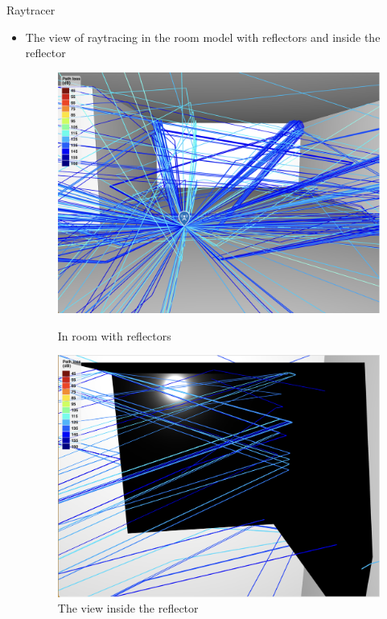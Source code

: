 \documentclass{beamer}
\begin{document}
\begin{frame}[t]{Raytracer}
	\begin{itemize}
	    \item The view of raytracing in the room model with reflectors and inside the reflector
        \vspace{0.5\baselineskip}
            \begin{figure}
                \centering
                \begin{minipage}{0.45\textwidth}
                    \centering
                    \includegraphics[height=0.7\textwidth]{figures/reflector_simulation_right.png}
                    \caption{In room with reflectors}
                \end{minipage}
                \begin{minipage}{0.45\textwidth}
                    \centering
                    \includegraphics[height=0.7\textwidth]{figures/reflections_inside_reflector.png}
                    \caption{The view inside the reflector}
                \end{minipage}
            \end{figure}
	\end{itemize}
\end{frame}
\end{document}
